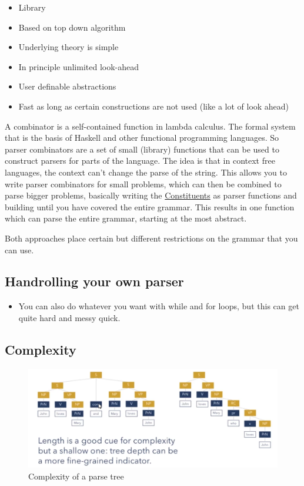 \documentclass[
  11pt,
  british,
]{article}
\providecommand{\tightlist}{%
  \setlength{\itemsep}{0pt}\setlength{\parskip}{0pt}}
\begin{document}
\begin{itemize}
\tightlist
\item
  Library
\item
  Based on top down algorithm
\item
  Underlying theory is simple
\item
  In principle unlimited look-ahead
\item
  User definable abstractions
\item
  Fast as long as certain constructions are not used (like a lot of look
  ahead)
\end{itemize}

A combinator is a self-contained function in lambda calculus. The formal
system that is the basis of Haskell and other functional programming
languages. So parser combinators are a set of small (library) functions
that can be used to construct parsers for parts of the language. The
idea is that in context free languages, the context can't change the
parse of the string. This allows you to write parser combinators for
small problems, which can then be combined to parse bigger problems,
basically writing the \href{Constituency.md}{Constituents} as parser
functions and building until you have covered the entire grammar. This
results in one function which can parse the entire grammar, starting at
the most abstract.

Both approaches place certain but different restrictions on the grammar
that you can use.

\hypertarget{handrolling-your-own-parser}{%
\subsection{Handrolling your own
parser}\label{handrolling-your-own-parser}}

\begin{itemize}
\tightlist
\item
  You can also do whatever you want with while and for loops, but this
  can get quite hard and messy quick.
\end{itemize}

\hypertarget{complexity}{%
\subsection{Complexity}\label{complexity}}

\begin{figure}
\centering
\includegraphics{Pasted_image_20220314190559.png}
\caption{Complexity of a parse tree}
\end{figure}
\end{document}
